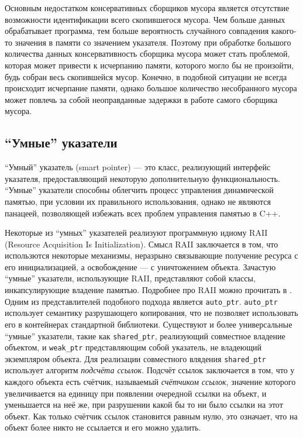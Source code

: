 Основным недостатком консервативных сборщиков мусора является отсутствие возможности идентификации
всего скопившегося мусора. Чем больше данных обрабатывает программа, тем больше вероятность случайного совпадения
какого-то значения в памяти со значением указателя. Поэтому при обработке большого количества данных
консервативность сборщика мусора может стать проблемой, которая может привести к исчерпанию памяти,
которого могло бы не произойти, будь собран весь скопившейся мусор.
Конечно, в подобной ситуации не всегда происходит исчерпание памяти, однако большое количество несобранного мусора
может повлечь за собой неоправданные задержки в работе самого сборщика мусора.

\subsection{``Умные'' указатели}
``Умный'' указатель (smart pointer) --- это класс, реализующий интерфейс указателя, предоставляющий некоторую
дополнительную функциональность.
``Умные'' указатели способны облегчить процесс управления динамической памятью, при условии их правильного использования,
однако не являются панацеей, позволяющей избежать всех проблем управления памятью в C++\cite{smartPointers}.

Некоторые из ``умных'' указателей реализуют программную идиому RAII (Resource Acquisition Is Initialization).
Смысл RAII заключается в том, что использются некоторые механизмы, неразрыно связывающие получение ресурса с его инициализацией,
а освобождение --- с уничтожением объекта. Зачастую ``умные'' указатели, использующие RAII, представляют собой классы,
инкапсулирующие владение памятью. Подробнее про RAII можно прочитать в \cite{CppPrinciples}.
Одним из представлителей подобного подхода является \lstinline[language= cpp]{auto_ptr}.
\lstinline[language= cpp]{auto_ptr} использует семантику разрушающего копирования, что не позволяет использовать его
в контейнерах стандартной библиотеки\cite{smartPointers}.
Существуют и более универсальные ``умные'' указатели, такие как \lstinline[language= cpp]{shared_ptr},
реализующий совместное владение объектом, и \lstinline[language= cpp]{weak_ptr} представляющим собой указатель,
не владеющий экземпляром объекта.
Для реализации совместного влядения \lstinline[language= cpp]{shared_ptr} использует алгоритм \textit{подсчёта ссылок}.
Подсчёт ссылок заключается в том, что у каждого объекта есть счётчик, называемый \textit{счётчиком ссылок},
значение которого увеличивается на единицу
при появлении очередной ссылки на объект, и уменьшается на неё же, при разрушении какой бы то ни было ссылки на этот объект.
Как только счётчик ссылок становится равным нулю, это означает, что на объект более никто не ссылается и его можно удалить.

